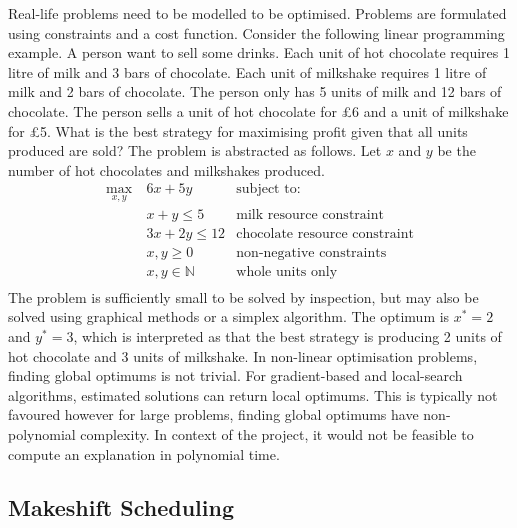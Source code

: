 Real-life problems need to be modelled to be optimised. Problems are formulated using constraints and a cost function. Consider the following linear programming example. A person want to sell some drinks. Each unit of hot chocolate requires 1 litre of milk and 3 bars of chocolate. Each unit of milkshake requires 1 litre of milk and 2 bars of chocolate. The person only has 5 units of milk and 12 bars of chocolate. The person sells a unit of hot chocolate for £6 and a unit of milkshake for £5. What is the best strategy for maximising profit given that all units produced are sold? The problem is abstracted as follows. Let $x$ and $y$ be the number of hot chocolates and milkshakes produced.
\begin{align*}
	\max_{x,y}\ &6x+5y&\text{subject to:}\\
	&x+y\leq 5&\text{milk resource constraint}\\
	&3x+2y\leq 12&\text{chocolate resource constraint}\\
	&x,y\geq 0&\text{non-negative constraints}\\
	&x,y\in\mathbb{N}&\text{whole units only}\\
\end{align*}
The problem is sufficiently small to be solved by inspection, but may also be solved using graphical methods or a simplex algorithm. The optimum is $x^*=2$ and $y^*=3$, which is interpreted as that the best strategy is producing 2 units of hot chocolate and 3 units of milkshake.
\linespace
In non-linear optimisation problems, finding global optimums is not trivial. For gradient-based and local-search algorithms, estimated solutions can return local optimums. This is typically not favoured however for large problems, finding global optimums have non-polynomial complexity. In context of the project, it would not be feasible to compute an explanation in polynomial time.

\subsection{Makeshift Scheduling}

